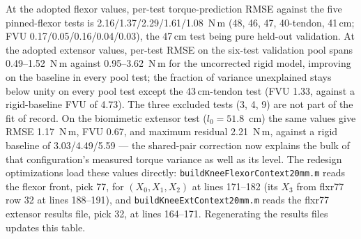 At the adopted flexor values, per-test torque-prediction RMSE against the five pinned-flexor tests is 2.16/1.37/2.29/1.61/1.08~N{\,m} (48, 46, 47, 40-tendon, 41\,cm; FVU 0.17/0.05/0.16/0.04/0.03), the 47\,cm test being pure held-out validation. At the adopted extensor values, per-test RMSE on the six-test validation pool spans 0.49--1.52~N{\,m} against 0.95--3.62~N{\,m} for the uncorrected rigid model, improving on the baseline in every pool test; the fraction of variance unexplained stays below unity on every pool test except the 43\,cm-tendon test (FVU 1.33, against a rigid-baseline FVU of 4.73). The three excluded tests (3, 4, 9) are not part of the fit of record. On the biomimetic extensor test ($l_{0} = 51.8$~cm) the same values give RMSE 1.17~N{\,m}, FVU 0.67, and maximum residual 2.21~N{\,m}, against a rigid baseline of 3.03/4.49/5.59 --- the shared-pair correction now explains the bulk of that configuration's measured torque variance as well as its level. The redesign optimizations load these values directly: \texttt{buildKneeFlexorContext20mm.m} reads the flexor front, pick 77, for $(X_{0},X_{1},X_{2})$ at lines 171--182 (its $X_{3}$ from flxr77 row 32 at lines 188--191), and \texttt{buildKneeExtContext20mm.m} reads the flxr77 extensor results file, pick 32, at lines 164--171. Regenerating the results files updates this table.

